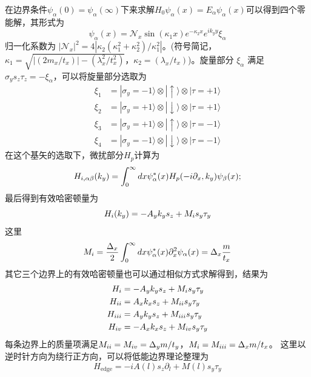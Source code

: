  在边界条件$\psi_\alpha(0)=\psi_\alpha(\infty)$下来求解$H_0\psi_\alpha(x)=E_\alpha\psi_\alpha(x)$可以得到四个零能解，其形式为
\begin{equation}
\psi_\alpha(x)=\mathcal{N}_x\sin(\kappa_1x)e^{-\kappa_2x}e^{ik_yy}\xi_\alpha
\end{equation}
归一化系数为 $|\mathcal{N}_x|^2=4|\kappa_2(\kappa_1^2+\kappa_2^2)/\kappa_1^2|$。(符号简记，$\kappa_1=\sqrt{|(2m_x/t_x)|-(\lambda_x^2/t_x^2)}$，$ \kappa_2=(\lambda_x/t_x)$)。旋量部分 $\xi_\alpha$ 满足 $\sigma_ys_z\tau_z=-\xi_\alpha$，可以将旋量部分选取为
\begin{equation}
\begin{aligned}
\xi_1&=|\sigma_y=-1\rangle\otimes|\uparrow\rangle\otimes|\tau=+1\rangle\\
\xi_2&=|\sigma_y=+1\rangle\otimes|\downarrow\rangle\otimes|\tau=+1\rangle\\
\xi_3&=|\sigma_y=+1\rangle\otimes|\uparrow\rangle\otimes|\tau=-1\rangle\\
\xi_4&=|\sigma_y=-1\rangle\otimes|\downarrow\rangle\otimes|\tau=-1\rangle
\end{aligned}
\end{equation}
在这个基矢的选取下，微扰部分$H_p$计算为
\begin{equation}
H_{\uppercase\expandafter{\romannumeral1},\alpha\beta}(k_y)=\int_{0}^{\infty}dx\psi^*_\alpha(x)H_p(-i\partial_x,k_y)\psi_\beta(x);
\end{equation}
最后得到有效哈密顿量为
\begin{equation}
H_{\uppercase\expandafter{\romannumeral1}}(k_y)=-A_yk_ys_z+M_{\uppercase\expandafter{\romannumeral1}}s_y\tau_y
\end{equation}
这里
\begin{equation}
M_{\uppercase\expandafter{\romannumeral1}}=\frac{\Delta_x}{2}\int_{0}^{\infty}dx\psi_\alpha^*(x)\partial_x^2\psi_\alpha(x)=\Delta_x\frac{m}{t_x}
\end{equation}
其它三个边界上的有效哈密顿量也可以通过相似方式求解得到，结果为
\begin{equation}
\begin{aligned}
H_{\uppercase\expandafter{\romannumeral1}}&=-A_yk_ys_z+M_{\uppercase\expandafter{\romannumeral1}}s_y\tau_y\\
H_{\uppercase\expandafter{\romannumeral2}}&=A_xk_xs_z+M_{\uppercase\expandafter{\romannumeral2}}s_y\tau_y\\
H_{\uppercase\expandafter{\romannumeral3}}&=A_yk_ys_z+M_{\uppercase\expandafter{\romannumeral3}}s_y\tau_y\\
H_{\uppercase\expandafter{\romannumeral4}}&=-A_xk_xs_z+M_{\uppercase\expandafter{\romannumeral4}}s_y\tau_y\\\label{edge1}
\end{aligned}
\end{equation}
每条边界上的质量项满足$M_{\uppercase\expandafter{\romannumeral2}}=M_{\uppercase\expandafter{\romannumeral4}}=\Delta_ym/t_y$，$M_{\uppercase\expandafter{\romannumeral1}}=M_{\uppercase\expandafter{\romannumeral3}}=\Delta_xm/t_x$。
这里以逆时针方向为绕行正方向，可以将低能边界理论整理为
\begin{equation}
H_{\mathrm{edge}}=-iA(l)s_z\partial_l+M(l)s_y\tau_y\label{edge2}
\end{equation}

